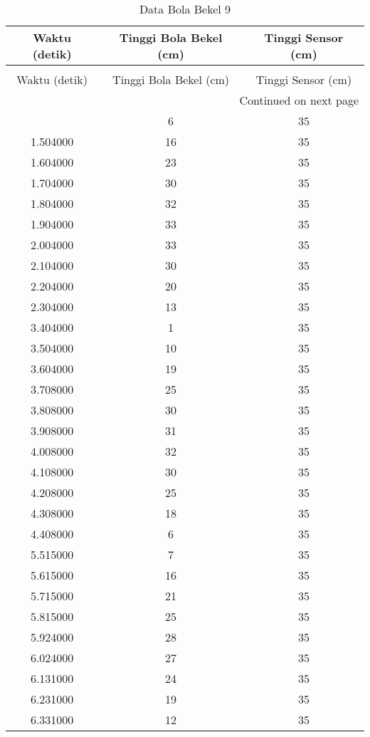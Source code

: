 \begin{longtable}[htbp]{|c|c|c|}
\caption{Data Bola Bekel 9} \\
\hline
Waktu (detik) & Tinggi Bola Bekel (cm) & Tinggi Sensor (cm) \\ \hline
\endfirsthead
\caption[]{Data Bola Bekel 9} \\
\hline
Waktu (detik) & Tinggi Bola Bekel (cm) & Tinggi Sensor (cm) \\ \hline
\endhead
\multicolumn{3}{r}{Continued on next page} \\
\endfoot
\endlastfoot
1.404000 & 6 & 35 \\ \hline
1.504000 & 16 & 35 \\ \hline
1.604000 & 23 & 35 \\ \hline
1.704000 & 30 & 35 \\ \hline
1.804000 & 32 & 35 \\ \hline
1.904000 & 33 & 35 \\ \hline
2.004000 & 33 & 35 \\ \hline
2.104000 & 30 & 35 \\ \hline
2.204000 & 20 & 35 \\ \hline
2.304000 & 13 & 35 \\ \hline
3.404000 & 1 & 35 \\ \hline
3.504000 & 10 & 35 \\ \hline
3.604000 & 19 & 35 \\ \hline
3.708000 & 25 & 35 \\ \hline
3.808000 & 30 & 35 \\ \hline
3.908000 & 31 & 35 \\ \hline
4.008000 & 32 & 35 \\ \hline
4.108000 & 30 & 35 \\ \hline
4.208000 & 25 & 35 \\ \hline
4.308000 & 18 & 35 \\ \hline
4.408000 & 6 & 35 \\ \hline
5.515000 & 7 & 35 \\ \hline
5.615000 & 16 & 35 \\ \hline
5.715000 & 21 & 35 \\ \hline
5.815000 & 25 & 35 \\ \hline
5.924000 & 28 & 35 \\ \hline
6.024000 & 27 & 35 \\ \hline
6.131000 & 24 & 35 \\ \hline
6.231000 & 19 & 35 \\ \hline
6.331000 & 12 & 35 \\ \hline

\end{longtable}
